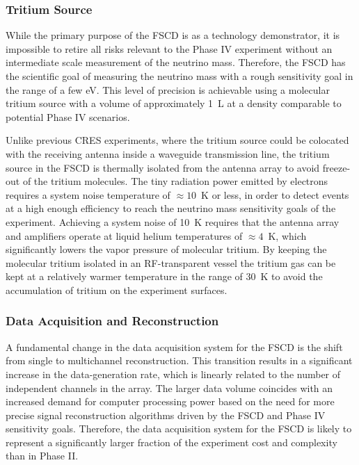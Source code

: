 \subsubsection*{Tritium Source}

While the primary purpose of the FSCD is as a technology demonstrator, it is impossible to retire all risks relevant to the Phase IV experiment without an intermediate scale measurement of the neutrino mass. Therefore, the FSCD has the scientific goal of measuring the neutrino mass with a rough sensitivity goal in the range of a few eV. This level of precision is achievable using a molecular tritium source with a volume of approximately 1~L at a density comparable to potential Phase IV scenarios.

Unlike previous CRES experiments, where the tritium source could be colocated with the receiving antenna inside a waveguide transmission line, the tritium source in the FSCD is thermally isolated from the antenna array to avoid freeze-out of the tritium molecules. The tiny radiation power emitted by electrons requires a system noise temperature of $\approx 10$~K or less, in order to detect events at a high enough efficiency to reach the neutrino mass sensitivity goals of the experiment. Achieving a system noise of 10~K requires that the antenna array and amplifiers operate at liquid helium temperatures of $\approx 4$~K, which significantly lowers the vapor pressure of molecular tritium. By keeping the molecular tritium isolated in an RF-transparent vessel the tritium gas can be kept at a relatively warmer temperature in the range of 30~K to avoid the accumulation of tritium on the experiment surfaces. 

\subsubsection*{Data Acquisition and Reconstruction}

A fundamental change in the data acquisition system for the FSCD is the shift from single to multichannel reconstruction. This transition results in a significant increase in the data-generation rate, which is linearly related to the number of independent channels in the array. The larger data volume coincides with an increased demand for computer processing power based on the need for more precise signal reconstruction algorithms driven by the FSCD and Phase IV sensitivity goals. Therefore, the data acquisition system for the FSCD is likely to represent a significantly larger fraction of the experiment cost and complexity than in Phase II.

